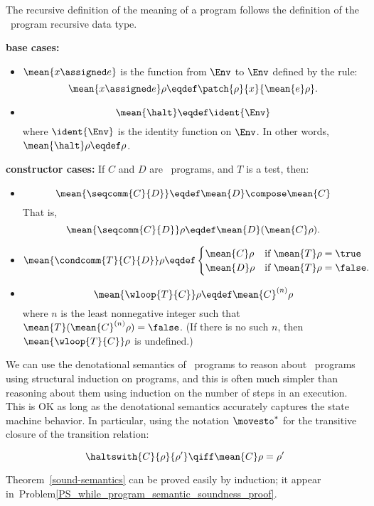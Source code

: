 The recursive definition of the meaning of a program follows the
definition of the \while\ program recursive data type.
\begin{definition}

\textbf{base cases:}
\begin{itemize}

\item $\mean{x \assigned e}$ is the function from $\Env$ to $\Env$ defined
  by the rule:
\[
\mean{x \assigned e}\rho \eqdef \patch{\rho}{x}{\mean{e}\rho}.
\]

\item
\[
\mean{\halt} \eqdef \ident{\Env}
\]
where $\ident{\Env}$ is the identity function on $\Env$.  In other words,
$\mean{\halt}\rho \eqdef \rho$.

\end{itemize}

\textbf{constructor cases:}
If $C$ and $D$ are \while\ programs, and $T$ is a test, then:
\begin{itemize}

\item
\[
\mean{\seqcomm{C}{D}} \eqdef \mean{D} \compose \mean{C}
\]
That is,
\[
\mean{\seqcomm{C}{D}}\rho \eqdef \mean{D}(\mean{C}\rho).
\]

\item
\[
\mean{\condcomm{T}{C}{D}}\rho
\eqdef
\begin{cases}
\mean{C}\rho & \text{if } \mean{T}\rho = \true\\
\mean{D}\rho & \text{if } \mean{T}\rho = \false.
\end{cases}
\]

\item
\[
\mean{\wloop{T}{C}}\rho \eqdef \mean{C}^{(n)}\rho
\]
where $n$ is the least nonnegative integer such that
$\mean{T}(\mean{C}^{(n)}\rho) = \false$.  (If there is no such $n$, then
$\mean{\wloop{T}{C}}\rho$ is undefined.)
\end{itemize}

\end{definition}

We can use the denotational semantics of \while\ programs to reason about
\while\ programs using structural induction on programs, and this is often
much simpler than reasoning about them using induction on the number of
steps in an execution.  This is OK as long as the denotational semantics
accurately captures the state machine behavior.  In particular, using the
notation $\movesto^*$ for the transitive closure of the transition
relation:
\begin{theorem}\label{sound-semantics}
\[
\haltswith{C}{\rho}{\rho'} \qiff \mean{C}\rho = \rho'
\]
\end{theorem}
Theorem~\ref{sound-semantics} can be proved easily by induction; it
appear in~Problem\ref{PS_while_program_semantic_soundness_proof}.

